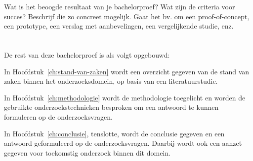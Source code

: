 Wat is het beoogde resultaat van je bachelorproef? Wat zijn de criteria voor succes? Beschrijf die zo concreet mogelijk. Gaat het bv. om een proof-of-concept, een prototype, een verslag met aanbevelingen, een vergelijkende studie, enz.

\section{}
\label{sec:opzet-bachelorproef}


De rest van deze bachelorproef is als volgt opgebouwd:

In Hoofdstuk~\ref{ch:stand-van-zaken} wordt een overzicht gegeven van de stand van zaken binnen het onderzoeksdomein, op basis van een literatuurstudie.

In Hoofdstuk~\ref{ch:methodologie} wordt de methodologie toegelicht en worden de gebruikte onderzoekstechnieken besproken om een antwoord te kunnen formuleren op de onderzoeksvragen.


In Hoofdstuk~\ref{ch:conclusie}, tenslotte, wordt de conclusie gegeven en een antwoord geformuleerd op de onderzoeksvragen. Daarbij wordt ook een aanzet gegeven voor toekomstig onderzoek binnen dit domein.